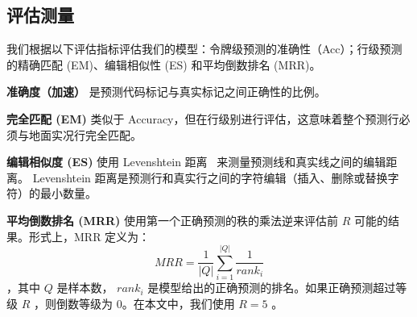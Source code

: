 \documentclass[UTF8]{article}
\begin{document}
 \subsection{评估测量}  我们根据以下评估指标评估我们的模型：令牌级预测的准确性（Acc）；行级预测的精确匹配 (EM)、编辑相似性 (ES) 和平均倒数排名 (MRR)。

 \textbf{准确度（加速）}  是预测代码标记与真实标记之间正确性的比例。

 \textbf{完全匹配 (EM)}  类似于 Accuracy，但在行级别进行评估，这意味着整个预测行必须与地面实况行完全匹配。

 \textbf{编辑相似度 (ES)}  使用 Levenshtein 距离~  \cite{1966SPhD...10..707L}  来测量预测线和真实线之间的编辑距离。 Levenshtein 距离是预测行和真实行之间的字符编辑（插入、删除或替换字符）的最小数量。

 \textbf{平均倒数排名 (MRR)}  使用第一个正确预测的秩的乘法逆来评估前  $R$  可能的结果。形式上，MRR 定义为：
  \begin{equation}
    \label{eq:mrr}
    MRR=\frac{1}{|Q|}\sum_{i=1}^{|Q|}\frac{1}{rank_i}
\end{equation} 
  \noindent  ，其中  $Q$  是样本数， $rank_i$  是模型给出的正确预测的排名。如果正确预测超过等级  $R$  ，则倒数等级为 0。在本文中，我们使用  $R=5$  。
\end{document}
